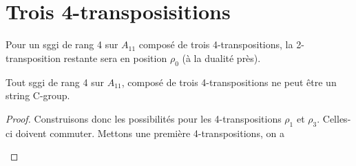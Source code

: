 \section{Trois 4-transposisitions}

\begin{lemma}
  Pour un sggi de rang 4 sur $A_{11}$ composé de trois 4-transpositions, la 2-transposition restante sera en position $\rho_0$ (à la dualité près).
\end{lemma}

\begin{theorem}
  Tout sggi de rang 4 sur $A_{11}$, composé de trois 4-transpositions ne peut être un string C-group.
\end{theorem}

\begin{proof}
  Construisons donc les possibilités pour les 4-transpositions $\rho_1$ et $\rho_3$. Celles-ci doivent commuter. Mettons une première 4-transpositions, on a
  \begin{figure}[H]
    \begin{center}
      \caption{}
    \end{center}
  \end{figure}


\end{proof}
